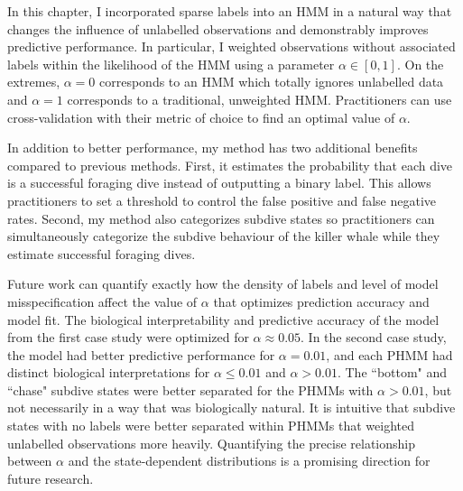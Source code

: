 

In this chapter, I incorporated sparse labels into an HMM in a natural way that changes the influence of unlabelled observations and demonstrably improves predictive performance. In particular, I weighted observations without associated labels within the likelihood of the HMM using a parameter $\alpha \in [0,1]$. On the extremes, $\alpha = 0$ corresponds to an HMM which totally ignores unlabelled data and $\alpha = 1$ corresponds to a traditional, unweighted HMM. Practitioners can use cross-validation with their metric of choice to find an optimal value of $\alpha$.

In addition to better performance, my method has two additional benefits compared to previous methods. First, it estimates the probability that each dive is a successful foraging dive instead of outputting a binary label. This allows practitioners to set a threshold to control the false positive and false negative rates. Second, my method also categorizes subdive states so practitioners can simultaneously categorize the subdive behaviour of the killer whale while they estimate successful foraging dives.

Future work can quantify exactly how the density of labels and level of model misspecification affect the value of $\alpha$ that optimizes prediction accuracy and model fit. The biological interpretability and predictive accuracy of the model from the first case study were optimized for $\alpha \approx 0.05$. In the second case study, the model had better predictive performance for $\alpha = 0.01$, and each PHMM had distinct biological interpretations for $\alpha \leq 0.01$ and $\alpha > 0.01$. The ``bottom" and ``chase" subdive states were better separated for the PHMMs with $\alpha > 0.01$, but not necessarily in a way that was biologically natural. It is intuitive that subdive states with no labels were better separated within PHMMs that weighted unlabelled observations more heavily. Quantifying the precise relationship between $\alpha$ and the state-dependent distributions is a promising direction for future research. 

